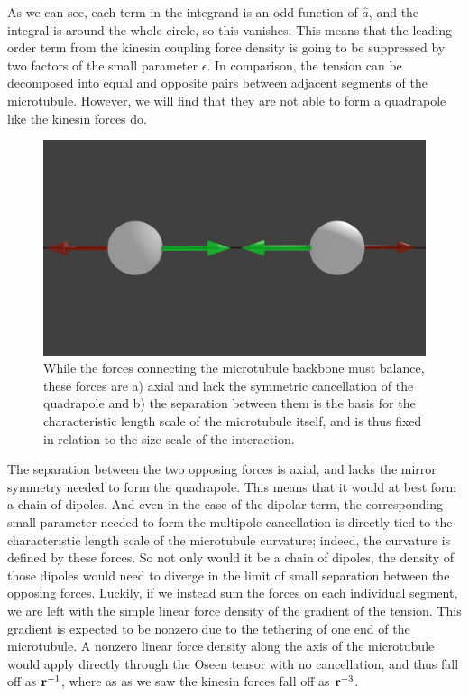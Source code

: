 \documentclass[11pt]{ucthesis}
\def\br{{\bf r}}
\begin{document}
As we can see, each term in the integrand is an odd function of $\hat{a}$, and the integral is around the whole circle, so this vanishes. 
This means that the leading order term from the kinesin coupling force density is going to be suppressed by two factors of the small parameter $\epsilon$.
In comparison, the tension can be decomposed into equal and opposite pairs between adjacent segments of the microtubule. However, we will find that they are not able to form a quadrapole like the kinesin forces do.
\begin{figure}[htp]
\begin{center}
\includegraphics[width=\hsize]{tenbal.png}
\caption{ 
While the forces connecting the microtubule backbone must balance, these forces are a) axial and lack the symmetric cancellation of the quadrapole and b) the separation between them is the basis for the characteristic length scale of the microtubule itself, and is thus fixed in relation to the size scale of the interaction.
}
\label{fig:quadforce}
\end{center}
\end{figure}
The separation between the two opposing forces is axial, and lacks the mirror symmetry needed to form the quadrapole. This means that it would at best form a chain of dipoles. 
And even in the case of the dipolar term,  the corresponding small parameter needed to form the multipole cancellation is directly tied to the characteristic length scale of the microtubule curvature; indeed, the curvature is defined by these forces. 
So not only would it be a chain of dipoles, the density of those dipoles would need to diverge in the limit of small separation between the opposing forces.
Luckily, if we instead sum the forces on each individual segment, we are left with the simple linear force density of the gradient of the tension. This gradient is expected to be nonzero due to the tethering of one end of the microtubule.
A nonzero linear force density along the axis of the microtubule would apply directly through the Oseen tensor with no cancellation, and thus fall off as $\br^{-1}$, where as as we saw the kinesin forces fall off as $\br^{-3}$.
 
\end{document}
